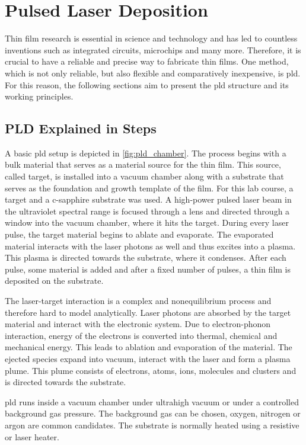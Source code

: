 \section{Pulsed Laser Deposition}
Thin film research is essential in science and 
technology and has led to countless inventions such as integrated circuits, 
microchips and many more. 
Therefore, it is crucial to have a reliable and precise way to fabricate thin films. 
One method, which is not only reliable, but also flexible and comparatively inexpensive,
is \ac{pld}. 
For this reason, the following sections aim to present the \ac{pld} structure and its 
working principles.

\subsection{PLD Explained in Steps}
A basic \ac{pld} setup is depicted in \cref{fig:pld_chamber}.
The process begins with a bulk material that serves as a material source for the thin 
film.
This source, called target, is installed into a vacuum chamber along with a 
substrate that serves as the foundation and growth template of the film.
For this lab course, a  target and a c-sapphire substrate was used.
A high-power pulsed laser beam in the ultraviolet spectral range is focused through a 
lens and directed through a window into the vacuum chamber, where it hits the target. 
During every laser pulse, the target material begins to ablate and evaporate. 
The evaporated material interacts with the laser photons as well and thus excites into a 
plasma. 
This plasma is directed towards the substrate, where it condenses.
After each pulse, some material is added and after a fixed number of pulses,
a thin film is deposited on the substrate. 

The laser-target interaction is a complex and nonequilibrium process and therefore
hard to model analytically.
Laser photons are absorbed by the target material and interact with the electronic 
system.
Due to electron-phonon interaction, energy of the electrons is converted 
into thermal, chemical and mechanical energy.
This leads to ablation and evaporation of the material.
The ejected species expand into vacuum, interact with the laser and form a plasma
plume. 
This plume consists of electrons, atoms, ions, molecules and clusters and is directed 
towards the substrate.

\ac{pld} runs inside a vacuum chamber under ultrahigh vacuum or under a controlled 
background gas pressure.
The background gas can be chosen, oxygen, nitrogen or argon are common candidates.
The substrate is normally heated using a resistive or laser heater.

